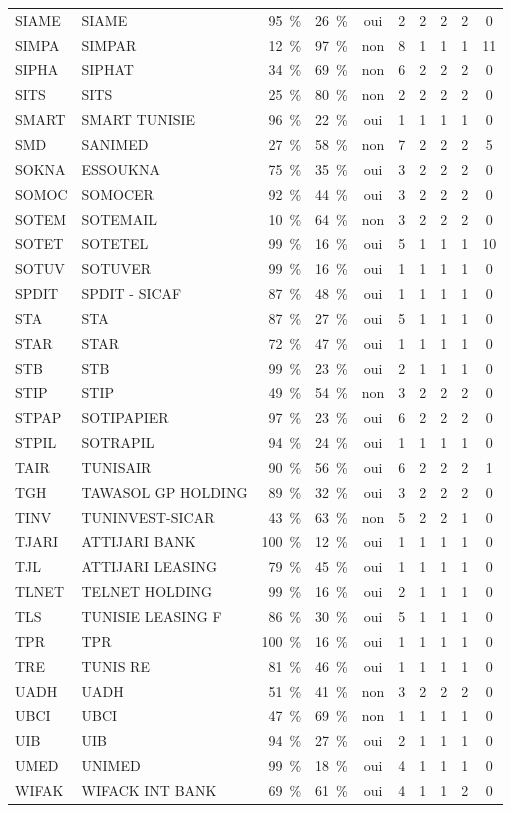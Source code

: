 \documentclass[11pt,a4paper]{article}
\begin{document}
{\begin{longtable}{llrrcccccc}
SIAME & SIAME & 95~\% & 26~\% & oui & 2 & 2 & 2 & 2 & 0 \\
SIMPA & SIMPAR & 12~\% & 97~\% & non & 8 & 1 & 1 & 1 & 11 \\
SIPHA & SIPHAT & 34~\% & 69~\% & non & 6 & 2 & 2 & 2 & 0 \\
SITS & SITS & 25~\% & 80~\% & non & 2 & 2 & 2 & 2 & 0 \\
SMART & SMART TUNISIE & 96~\% & 22~\% & oui & 1 & 1 & 1 & 1 & 0 \\
SMD & SANIMED & 27~\% & 58~\% & non & 7 & 2 & 2 & 2 & 5 \\
SOKNA & ESSOUKNA & 75~\% & 35~\% & oui & 3 & 2 & 2 & 2 & 0 \\
SOMOC & SOMOCER & 92~\% & 44~\% & oui & 3 & 2 & 2 & 2 & 0 \\
SOTEM & SOTEMAIL & 10~\% & 64~\% & non & 3 & 2 & 2 & 2 & 0 \\
SOTET & SOTETEL & 99~\% & 16~\% & oui & 5 & 1 & 1 & 1 & 10 \\
SOTUV & SOTUVER & 99~\% & 16~\% & oui & 1 & 1 & 1 & 1 & 0 \\
SPDIT & SPDIT - SICAF & 87~\% & 48~\% & oui & 1 & 1 & 1 & 1 & 0 \\
STA & STA & 87~\% & 27~\% & oui & 5 & 1 & 1 & 1 & 0 \\
STAR & STAR & 72~\% & 47~\% & oui & 1 & 1 & 1 & 1 & 0 \\
STB & STB & 99~\% & 23~\% & oui & 2 & 1 & 1 & 1 & 0 \\
STIP & STIP & 49~\% & 54~\% & non & 3 & 2 & 2 & 2 & 0 \\
STPAP & SOTIPAPIER & 97~\% & 23~\% & oui & 6 & 2 & 2 & 2 & 0 \\
STPIL & SOTRAPIL & 94~\% & 24~\% & oui & 1 & 1 & 1 & 1 & 0 \\
TAIR & TUNISAIR & 90~\% & 56~\% & oui & 6 & 2 & 2 & 2 & 1 \\
TGH & TAWASOL GP HOLDING & 89~\% & 32~\% & oui & 3 & 2 & 2 & 2 & 0 \\
TINV & TUNINVEST-SICAR & 43~\% & 63~\% & non & 5 & 2 & 2 & 1 & 0 \\
TJARI & ATTIJARI BANK & 100~\% & 12~\% & oui & 1 & 1 & 1 & 1 & 0 \\
TJL & ATTIJARI LEASING & 79~\% & 45~\% & oui & 1 & 1 & 1 & 1 & 0 \\
TLNET & TELNET HOLDING & 99~\% & 16~\% & oui & 2 & 1 & 1 & 1 & 0 \\
TLS & TUNISIE LEASING F & 86~\% & 30~\% & oui & 5 & 1 & 1 & 1 & 0 \\
TPR & TPR & 100~\% & 16~\% & oui & 1 & 1 & 1 & 1 & 0 \\
TRE & TUNIS RE & 81~\% & 46~\% & oui & 1 & 1 & 1 & 1 & 0 \\
UADH & UADH & 51~\% & 41~\% & non & 3 & 2 & 2 & 2 & 0 \\
UBCI & UBCI & 47~\% & 69~\% & non & 1 & 1 & 1 & 1 & 0 \\
UIB & UIB & 94~\% & 27~\% & oui & 2 & 1 & 1 & 1 & 0 \\
UMED & UNIMED & 99~\% & 18~\% & oui & 4 & 1 & 1 & 1 & 0 \\
WIFAK & WIFACK INT BANK & 69~\% & 61~\% & oui & 4 & 1 & 1 & 2 & 0 \\
\end{longtable}}
\end{document}
